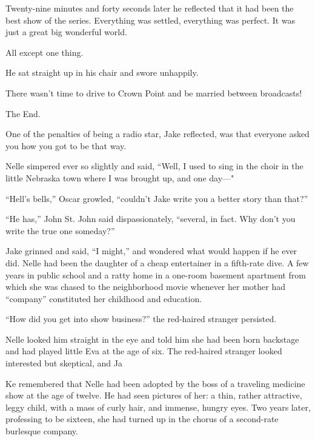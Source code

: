 \documentclass{novel}
\begin{document}
Twenty-nine minutes and forty seconds later he reflected that it had been the best show of the series. Everything was settled, everything was perfect. It was just a great big wonderful world.

All except one thing.

He sat straight up in his chair and swore unhappily.

There wasn't time to drive to Crown Point and be married between broadcasts!

The End.

\begin{ChapterStart}
\vspace{3\nbs}
\end{ChapterStart}

One of the penalties of being a radio star, Jake reflected, was that everyone asked you how you got to be that way.

Nelle simpered ever so slightly and said, “Well, I used to sing in the choir in the little Nebraska town where I was brought up, and one day—"

“Hell’s bells,” Oscar growled, “couldn’t Jake write you a better story than that?”

“He has,” John St. John said dispassionately, “several, in fact. Why don’t you write the true one someday?”

Jake grinned and said, “I might,” and wondered what would happen if he ever did. Nelle had been the daughter of a cheap entertainer in a fifth-rate dive. A few years in public school and a ratty home in a one-room basement apartment from which she was chased to the neighborhood movie whenever her mother had “company” constituted her childhood and education.

“How did you get into show business?” the red-haired stranger persisted.

Nelle looked him straight in the eye and told him she had been born backstage and had played little Eva at the age of six. The red-haired stranger looked interested but skeptical, and Ja

Ke remembered that Nelle had been adopted by the boss of a traveling medicine show at the age of twelve. He had seen pictures of her: a thin, rather attractive, leggy child, with a mass of curly hair, and immense, hungry eyes. Two years later, professing to be sixteen, she had turned up in the chorus of a second-rate burlesque company.
\end{document}
